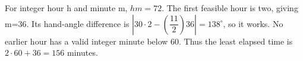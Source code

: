 For integer hour h and minute m, $hm=72$. The first feasible hour is two, giving m=36. Its hand-angle difference is $|30\cdot2-(\dfrac{11}{2})36|=138^\circ$, so it works. No earlier hour has a valid integer minute below 60. Thus the least elapsed time is $2\cdot60+36=\boxed{156}$ minutes.

